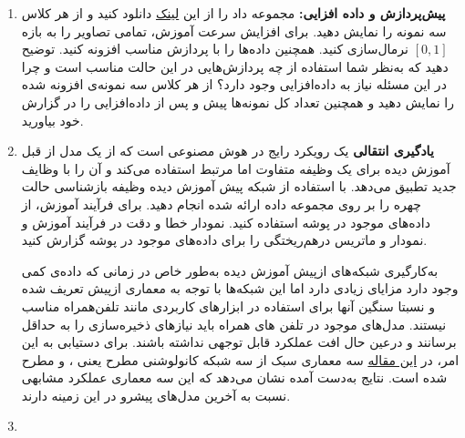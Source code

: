 \begin{enumerate}
	\item \textbf{پیش‌پردازش و داده افزایی: }
	مجموعه داد را از این \href{https://drive.google.com/file/d/1jTou5SjDGMgHkcJ38DrlwvNvZ8YCe2IR/view?usp=sharing}{لینک} دانلود کنید و از هر کلاس سه نمونه را نمایش دهید. برای افزایش سرعت آموزش، تمامی تصاویر را به بازه $[0,1]$ نرمال‌سازی کنید. همچنین داده‌ها را با پردازش مناسب افزونه کنید. توضیح دهید که به‌نظر شما استفاده از چه پردازش‌هایی در این حالت مناسب است و چرا در این مسئله نیاز به داده‌افزایی وجود دارد؟ از هر کلاس سه نمونه‌ی افزونه شده را نمایش دهید و همچنین تعداد کل نمونه‌ها پیش و پس از داده‌افزایی را در گزارش خود بیاورید.
	
	
	\item \textbf{یادگیری انتقالی }
	یک رویکرد رایج در هوش مصنوعی است که از یک مدل از قبل آموزش دیده برای یک وظیفه متفاوت اما مرتبط استفاده می‌کند و آن را با وظایف جدید تطبیق می‌دهد. با استفاده از شبکه پیش آموزش دیده  وظیفه بازشناسی حالت چهره را بر روی مجموعه داده ارائه شده انجام دهید. برای فرآیند آموزش، از داده‌های موجود در پوشه  استفاده کنید. نمودار خطا و دقت در فرآیند آموزش و نمودار  و ماتریس درهم‌ریختگی را برای داده‌های موجود در پوشه  گزارش کنید.
	
	به‌کارگیری شبکه‌های ازپیش آموزش دیده به‌طور خاص در زمانی که داده‌ی کمی وجود دارد مزایای زیادی دارد اما این شبکه‌ها با توجه به معماری از‌پیش تعریف شده و نسبتا سنگین آنها برای استفاده در ابزار‌های کاربردی مانند تلفن‌همراه مناسب نیستند. مدل‌های موجود در تلفن های همراه باید نیاز‌های ذخیره‌سازی را به حداقل برسانند و درعین حال افت عملکرد قابل توجهی نداشته باشند. برای دستیابی به این امر، در \href{https://arxiv.org/pdf/1807.08775.pdf}{این مقاله} سه معماری سبک از سه شبکه کانولوشنی مطرح یعنی ،  و  مطرح شده است. نتایج به‌دست آمده نشان می‌دهد که این سه معماری عملکرد مشابهی نسبت به آخرین مدل‌های پیشرو در این زمینه دارند.
	
	
	\item 
	
	
	
	
	
	

\end{enumerate}


